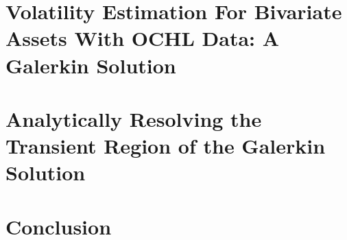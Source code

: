 \chapter{Volatility Estimation For Bivariate Assets With OCHL Data: A Galerkin Solution}


\chapter{Analytically Resolving the Transient Region of the Galerkin Solution}



\chapter{Conclusion}



\nocite{*}

\singlespacing

\doublespacing

